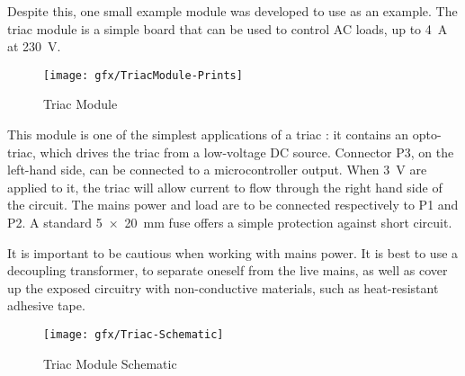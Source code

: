 Despite this, one small example module was developed to use as an example. The
triac module is a simple board that can be used to control AC loads, up to
\SI{4}{A} at \SI{230}{V}.

\begin{figure}[htb]
  \begin{center}
    \texttt{[image: gfx/TriacModule-Prints]}
  \end{center}
  \caption{Triac Module}
  \label{fig:triac-module}
\end{figure}

This module is one of the simplest applications of a triac : it contains an
opto-triac, which drives the triac from a low-voltage DC source. Connector P3,
on the left-hand side, can be connected to a microcontroller output. When
\SI{3}{V} are applied to it, the triac will allow current to flow through the
right hand side of the circuit. The mains power and load are to be connected
respectively to P1 and P2. A standard \SI{5x20}{mm} fuse offers a simple
protection against short circuit.

It is important to be cautious when working with mains power. It is best to use
a decoupling transformer, to separate oneself from the live mains, as well as
cover up the exposed circuitry with non-conductive materials, such as
heat-resistant adhesive tape.

\begin{figure}[htb]
  \begin{center}
    \texttt{[image: gfx/Triac-Schematic]}
  \end{center}
  \caption{Triac Module Schematic}
  \label{fig:triac-schematic}
\end{figure}




